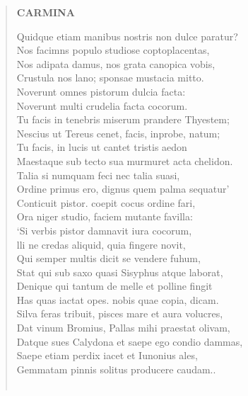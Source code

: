 \documentclass[11pt, a4paper]{report}
\begin{document}
\begin{verse}
    \begin{center} \textbf{CARMINA} \end{center} \marginpar{[168]} Quidque etiam manibus nostris non dulce paratur? \\ Nos facimns populo studiose coptoplacentas, \\ Nos adipata damus, nos grata canopica vobis, \\ Crustula nos lano; sponsae mustacia mitto. \\ Noverunt omnes pistorum dulcia facta: \\ Noverunt multi crudelia facta cocorum. \\ Tu facis in tenebris miserum prandere Thyestem; \\ Nescius ut Tereus cenet, facis, inprobe, natum; \\ Tu facis, in lucis ut cantet tristis aedon \\ Maestaque sub tecto sua murmuret acta chelidon. \\ Talia si numquam feci nec talia suasi, \\ Ordine primus ero, dignus quem palma sequatur’ \\ Conticuit pistor. coepit cocus ordine fari, \\ Ora niger studio, faciem mutante favilla: \\ ‘Si verbis pistor damnavit iura cocorum, \\ lli ne credas aliquid, quia fingere novit, \\ Qui semper multis dicit se vendere fuhum, \\ Stat qui sub saxo quasi Sisyphus atque laborat, \\ Denique qui tantum de melle et polline fingit \\ Has quas iactat opes. nobis quae copia, dicam. \\ Silva feras tribuit, pisces mare et aura volucres, \\ Dat vinum Bromius, Pallas mihi praestat olivam, \\ Datque sues Calydona et saepe ego condio dammas, \\ Saepe etiam perdix iacet et Iunonius ales, \\ Gemmatam pinnis solitus producere caudam.. \\ 
        ﻿\pagebreak 

\end{verse}
\end{document}
